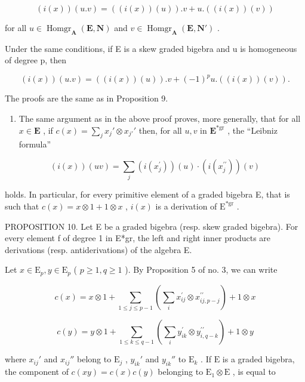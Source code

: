 \[
(i (x)) (u. v) = ((i (x)) (u)). v + u. ((i (x)) (v))
\]

for all \(u \in \operatorname{Homgr}_{\mathbf{A}}(\mathbf{E}, \mathbf{N})\) and \(v \in \operatorname{Homgr}_{\mathbf{A}}(\mathbf{E}, \mathbf{N}')\) .

Under the same conditions, if E is a skew graded bigebra and u is homogeneous of degree p, then

\[
(i (x)) (u. v) = ((i (x)) (u)). v + (- 1) ^ {p} u. ((i (x)) (v)).
\]

The proofs are the same as in Proposition 9.

\begin{enumerate}
\def\labelenumi{(\arabic{enumi})}
\setcounter{enumi}{1}
\tightlist
\item
  The same argument as in the above proof proves, more generally, that for all \(x \in \mathbf{E}\) , if \(c(x) = \sum_{j} x_j' \otimes x_{j'}'\) then, for all \(u, v\) in \(\mathbf{E}^{*\mathrm{gr}}\) , the ``Leibniz formula''
\end{enumerate}

\[
(i (x)) (u v) = \sum_ {j} (i (x _ {j} ^ {\prime})) (u) \cdot (i (x _ {j} ^ {\prime \prime})) (v)
\]

holds. In particular, for every primitive element of a graded bigebra E, that is such that \(c(x) = x \otimes 1 + 1 \otimes x\) , \(i(x)\) is a derivation of \(\mathrm{E}^{*\mathrm{gr}}\) .

PROPOSITION 10. Let E be a graded bigebra (resp. skew graded bigebra). For every element f of degree 1 in E*gr, the left and right inner products are derivations (resp. antiderivations) of the algebra E.

Let \(x \in \mathrm{E}_p, y \in \mathrm{E}_p\) ( \(p \geqslant 1, q \geqslant 1\) ). By Proposition 5 of no. 3, we can write

\[
c (x) = x \otimes 1 + \sum_ {1 \leqslant j \leqslant p - 1} \left(\sum_ {i} x _ {i j} ^ {\prime} \otimes x _ {i j, p - j} ^ {\prime \prime}\right) + 1 \otimes x
\]

\[
c (y) = y \otimes 1 + \sum_ {1 \leqslant k \leqslant q - 1} \left(\sum_ {i} y _ {i k} ^ {\prime} \otimes y _ {i, q - k} ^ {\prime \prime}\right) + 1 \otimes y
\]

where \(x_{ij}'\) and \(x_{ij}''\) belong to \(\mathrm{E}_j\) , \(y_{ik}'\) and \(y_{ik}''\) to \(\mathrm{E}_k\) . If \(\mathrm{E}\) is a graded bigebra, the component of \(c(xy) = c(x)c(y)\) belonging to \(\mathrm{E}_1 \otimes \mathrm{E}\) , is equal to

